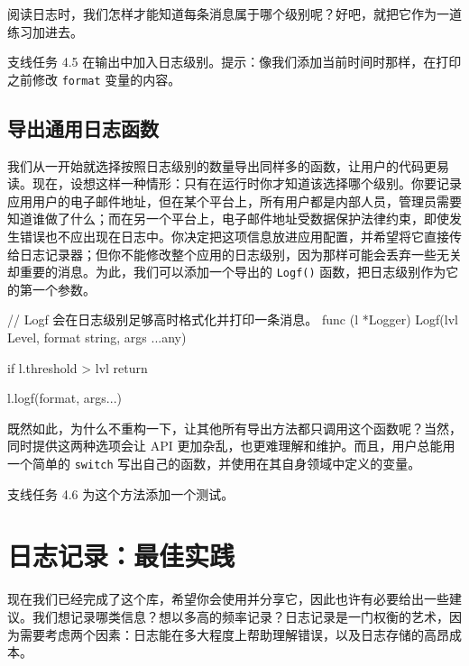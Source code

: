 阅读日志时，我们怎样才能知道每条消息属于哪个级别呢？好吧，就把它作为一道练习加进去。

\begin{infobox}{支线任务 4.5}
在输出中加入日志级别。提示：像我们添加当前时间时那样，在打印之前修改 \texttt{format} 变量的内容。
\end{infobox}

\subsection{导出通用日志函数}

我们从一开始就选择按照日志级别的数量导出同样多的函数，让用户的代码更易读。现在，设想这样一种情形：只有在运行时你才知道该选择哪个级别。你要记录应用用户的电子邮件地址，但在某个平台上，所有用户都是内部人员，管理员需要知道谁做了什么；而在另一个平台上，电子邮件地址受数据保护法律约束，即使发生错误也不应出现在日志中。你决定把这项信息放进应用配置，并希望将它直接传给日志记录器；但你不能修改整个应用的日志级别，因为那样可能会丢弃一些无关却重要的消息。为此，我们可以添加一个导出的 \texttt{Logf()} 函数，把日志级别作为它的第一个参数。

\begin{gocode}[title={代码清单 4.16 \texttt{logger.go}：导出的 \texttt{Logf} 函数}]
// Logf 会在日志级别足够高时格式化并打印一条消息。
func (l *Logger) Logf(lvl Level, format string, args ...any) {
    if l.threshold > lvl {
        return
    }

    l.logf(format, args...)
}
\end{gocode}

既然如此，为什么不重构一下，让其他所有导出方法都只调用这个函数呢？当然，同时提供这两种选项会让 API 更加杂乱，也更难理解和维护。而且，用户总能用一个简单的 \texttt{switch} 写出自己的函数，并使用在其自身领域中定义的变量。

\begin{infobox}{支线任务 4.6}
为这个方法添加一个测试。
\end{infobox}

\section{日志记录：最佳实践}

现在我们已经完成了这个库，希望你会使用并分享它，因此也许有必要给出一些建议。我们想记录哪类信息？想以多高的频率记录？日志记录是一门权衡的艺术，因为需要考虑两个因素：日志能在多大程度上帮助理解错误，以及日志存储的高昂成本。

